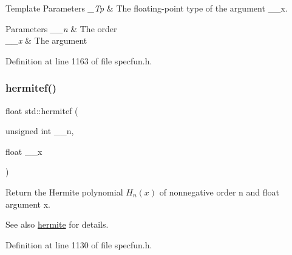 \begin{DoxyTemplParams}{Template Parameters}
{\em \+\_\+\+Tp} & The floating-\/point type of the argument {\ttfamily \+\_\+\+\_\+x}. \\
\hline
\end{DoxyTemplParams}

\begin{DoxyParams}{Parameters}
{\em \+\_\+\+\_\+n} & The order \\
\hline
{\em \+\_\+\+\_\+x} & The argument \\
\hline
\end{DoxyParams}


Definition at line 1163 of file specfun.\+h.

\mbox{\label{group__mathsf__std_ga94dae7444bb349e33057a92932db8abe}} 
\subsubsection{\texorpdfstring{hermitef()}{hermitef()}}
{\footnotesize\ttfamily float std\+::hermitef (\begin{DoxyParamCaption}\item[{unsigned int}]{\+\_\+\+\_\+n,  }\item[{float}]{\+\_\+\+\_\+x }\end{DoxyParamCaption})\hspace{0.3cm}{\ttfamily [inline]}}

Return the Hermite polynomial $ H_n(x) $ of nonnegative order n and float argument {\ttfamily x}.

\begin{DoxySeeAlso}{See also}
\hyperlink{group__mathsf__std_ga8bd1626f1e3f7256c4fd13579f881183}{hermite} for details. 
\end{DoxySeeAlso}


Definition at line 1130 of file specfun.\+h.

\mbox{\label{group__mathsf__std_ga21f8e312ee3e65286f86bf141b0f32e0}} 
